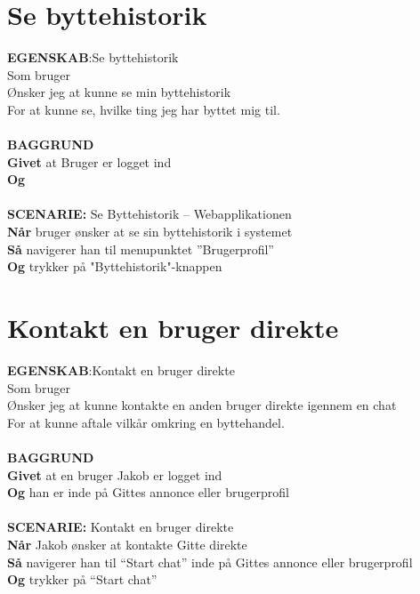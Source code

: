 \section{Se byttehistorik}
{\color{blue}\textbf{EGENSKAB}:}Se byttehistorik \\
Som bruger \\
Ønsker jeg at kunne se min byttehistorik \\
For at kunne se, hvilke ting jeg har byttet mig til.\\ \\
{\color{blue}\textbf{BAGGRUND}} \\
{\color{blue}\textbf{Givet}} at Bruger er logget ind \\
{\color{blue}\textbf{Og}} \\\\
{\color{blue}\textbf{SCENARIE:}} Se Byttehistorik – Webapplikationen \\
{\color{blue}\textbf{Når}} bruger ønsker at se sin byttehistorik i systemet\\
{\color{blue}\textbf{Så}} navigerer han til menupunktet ”Brugerprofil” \\
{\color{blue}\textbf{Og}} trykker på "Byttehistorik"-knappen

\section{Kontakt en bruger direkte}
{\color{blue}\textbf{EGENSKAB}:}Kontakt en bruger direkte \\
Som bruger \\
Ønsker jeg at kunne kontakte en anden bruger direkte igennem en chat \\
For at kunne aftale vilkår omkring en byttehandel.\\ \\
{\color{blue}\textbf{BAGGRUND}} \\
{\color{blue}\textbf{Givet}} at en bruger Jakob er logget ind \\
{\color{blue}\textbf{Og}} han er inde på Gittes annonce eller brugerprofil\\\\
{\color{blue}\textbf{SCENARIE:}} Kontakt en bruger direkte\\
{\color{blue}\textbf{Når}} Jakob ønsker at kontakte Gitte direkte\\
{\color{blue}\textbf{Så}} navigerer han til “Start chat” inde på Gittes annonce eller brugerprofil \\
{\color{blue}\textbf{Og}} trykker på “Start chat”

